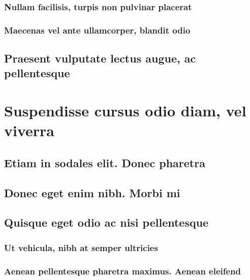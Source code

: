 \documentclass[%
  german,%
  exercise,%
  oneside,%
]{iswartcl}
\begin{document}
\lipsum[1-8]

\subsubsection{Nullam facilisis, turpis non pulvinar placerat}

\lipsum[1-8]

\subsubsection{Maecenas vel ante ullamcorper, blandit odio}

\lipsum[1-8]

\subsection{Praesent vulputate lectus augue, ac pellentesque}

\lipsum[1-8]

\section{Suspendisse cursus odio diam, vel viverra}

\lipsum[1-8]

\subsection{Etiam in sodales elit. Donec pharetra}

\lipsum[1-8]

\subsection{Donec eget enim nibh. Morbi mi}

\lipsum[1-8]

\subsection{Quisque eget odio ac nisi pellentesque}

\lipsum[1-8]

\subsubsection{Ut vehicula, nibh at semper ultricies}

\lipsum[1-8]

\subsubsection{Aenean pellentesque pharetra maximus. Aenean eleifend}
\end{document}
